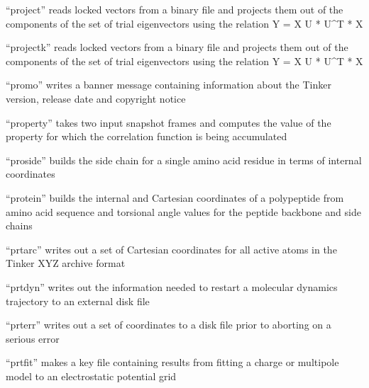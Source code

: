 \documentclass[letterpaper,11pt,english]{sphinxmanual}
\begin{document}


“project” reads locked vectors from a binary file and projects
them out of the components of the set of trial eigenvectors
using the relation Y = X \sphinxhyphen{} U * U\textasciicircum{}T * X


“projectk” reads locked vectors from a binary file and projects
them out of the components of the set of trial eigenvectors
using the relation Y = X \sphinxhyphen{} U * U\textasciicircum{}T * X


“promo” writes a banner message containing information
about the Tinker version, release date and copyright notice


“property” takes two input snapshot frames and computes the
value of the property for which the correlation function is
being accumulated


“proside” builds the side chain for a single amino acid
residue in terms of internal coordinates


“protein” builds the internal and Cartesian coordinates
of a polypeptide from amino acid sequence and torsional
angle values for the peptide backbone and side chains


“prtarc” writes out a set of Cartesian coordinates for
all active atoms in the Tinker XYZ archive format


“prtdyn” writes out the information needed to restart a
molecular dynamics trajectory to an external disk file


“prterr” writes out a set of coordinates to a disk
file prior to aborting on a serious error


“prtfit” makes a key file containing results from fitting a
charge or multipole model to an electrostatic potential grid
\end{document}
